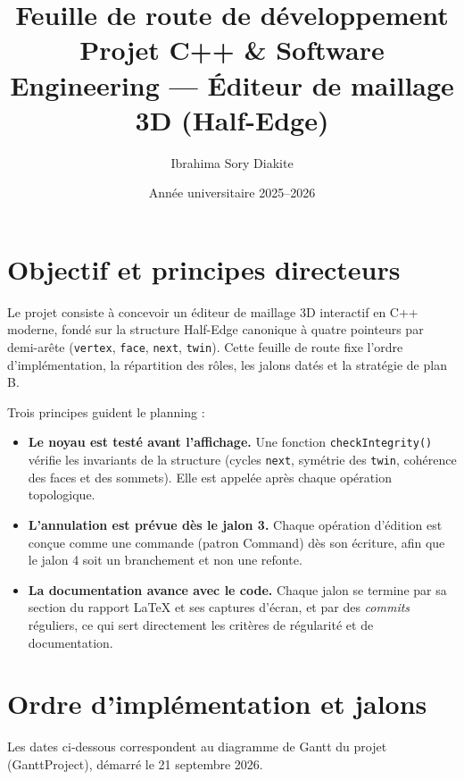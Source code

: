 \documentclass[11pt,a4paper]{article}
\title{Feuille de route de développement\\[0.3em]\large Projet C++ \& Software Engineering --- Éditeur de maillage 3D (Half-Edge)}
\author{Ibrahima Sory Diakite}
\date{Année universitaire 2025--2026}
\begin{document}
\maketitle

\section{Objectif et principes directeurs}

Le projet consiste à concevoir un éditeur de maillage 3D interactif en C++ moderne, fondé sur la structure Half-Edge canonique à quatre pointeurs par demi-arête (\texttt{vertex}, \texttt{face}, \texttt{next}, \texttt{twin}). Cette feuille de route fixe l'ordre d'implémentation, la répartition des rôles, les jalons datés et la stratégie de plan B.

Trois principes guident le planning :
\begin{itemize}[nosep]
  \item \textbf{Le noyau est testé avant l'affichage.} Une fonction \texttt{checkIntegrity()} vérifie les invariants de la structure (cycles \texttt{next}, symétrie des \texttt{twin}, cohérence des faces et des sommets). Elle est appelée après chaque opération topologique.
  \item \textbf{L'annulation est prévue dès le jalon 3.} Chaque opération d'édition est conçue comme une commande (patron Command) dès son écriture, afin que le jalon 4 soit un branchement et non une refonte.
  \item \textbf{La documentation avance avec le code.} Chaque jalon se termine par sa section du rapport \LaTeX{} et ses captures d'écran, et par des \emph{commits} réguliers, ce qui sert directement les critères de régularité et de documentation.
\end{itemize}

\section{Ordre d'implémentation et jalons}

Les dates ci-dessous correspondent au diagramme de Gantt du projet (GanttProject), démarré le 21 septembre 2026.
\end{document}
